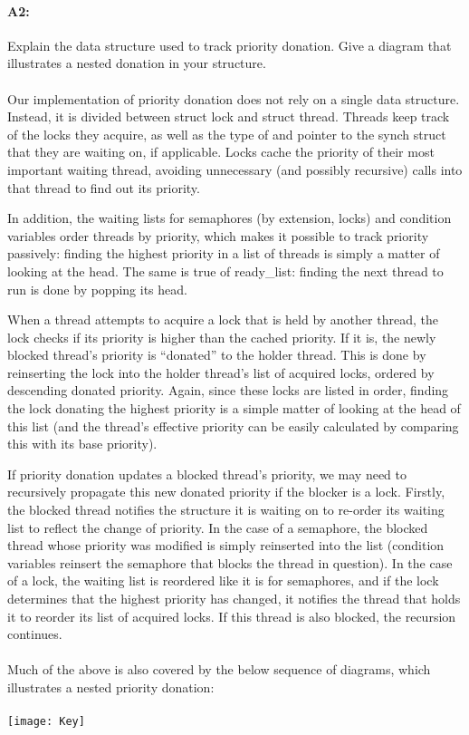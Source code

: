 \paragraph{A2:} %
Explain the data structure used to track priority donation. Give a diagram that illustrates a nested donation in your structure.
\\
\\
Our implementation of priority donation does not rely on a single data structure. Instead, it is divided between struct lock and struct thread. Threads keep track of the locks they acquire, as well as the type of and pointer to the synch struct that they are waiting on, if applicable. Locks cache the priority of their most important waiting thread, avoiding unnecessary (and possibly recursive) calls into that thread to find out its priority.

In addition, the waiting lists for semaphores (by extension, locks) and condition variables order threads by priority, which makes it possible to track priority passively: finding the highest priority in a list of threads is simply a matter of looking at the head. The same is true of ready\_list: finding the next thread to run is done by popping its head.

When a thread attempts to acquire a lock that is held by another thread, the lock checks if its priority is higher than the cached priority. If it is, the newly blocked thread's priority is ``donated'' to the holder thread. This is done by reinserting the lock into the holder thread's list of acquired locks, ordered by descending donated priority. Again, since these locks are listed in order, finding the lock donating the highest priority is a simple matter of looking at the head of this list (and the thread's effective priority can be easily calculated by comparing this with its base priority).

If priority donation updates a blocked thread's priority, we may need to recursively propagate this new donated priority if the blocker is a lock. Firstly, the blocked thread notifies the structure it is waiting on to re-order its waiting list to reflect the change of priority.
In the case of a semaphore, the blocked thread whose priority was modified is simply reinserted into the list (condition variables reinsert the semaphore that blocks the thread in question).
In the case of a lock, the waiting list is reordered like it is for semaphores, and if the lock determines that the highest priority has changed, it notifies the thread that holds it to reorder its list of acquired locks. If this thread is also blocked, the recursion continues.
\\
\\
Much of the above is also covered by the below sequence of diagrams, which illustrates a nested priority donation:
\\
\\
\texttt{[image: Key]}

